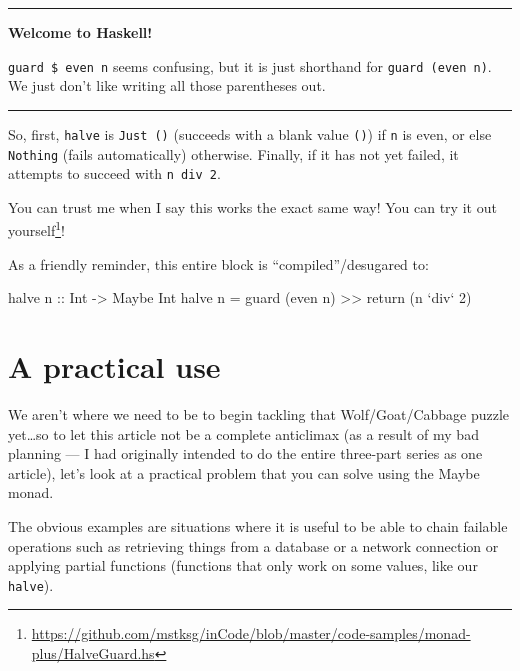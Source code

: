 \documentclass[]{article}
\newenvironment{Shaded}{}{}
\newcommand{\DataTypeTok}[1]{\textcolor[rgb]{0.56,0.13,0.00}{#1}}
\newcommand{\DecValTok}[1]{\textcolor[rgb]{0.25,0.63,0.44}{#1}}
\newcommand{\OtherTok}[1]{\textcolor[rgb]{0.00,0.44,0.13}{#1}}
\newcommand{\FunctionTok}[1]{\textcolor[rgb]{0.02,0.16,0.49}{#1}}
\newcommand{\NormalTok}[1]{#1}
\renewcommand{\href}[2]{#2\footnote{\url{#1}}}
\begin{document}
\begin{center}\rule{0.5\linewidth}{\linethickness}\end{center}

\textbf{Welcome to Haskell!}

\texttt{guard\ \$\ even\ n} seems confusing, but it is just shorthand for
\texttt{guard\ (even\ n)}. We just don't like writing all those parentheses out.

\begin{center}\rule{0.5\linewidth}{\linethickness}\end{center}

So, first, \texttt{halve} is \texttt{Just\ ()} (succeeds with a blank value
\texttt{()}) if \texttt{n} is even, or else \texttt{Nothing} (fails
automatically) otherwise. Finally, if it has not yet failed, it attempts to
succeed with \texttt{n\ \textasciigrave{}div\textasciigrave{}\ 2}.

You can trust me when I say this works the exact same way! You can
\href{https://github.com/mstksg/inCode/blob/master/code-samples/monad-plus/HalveGuard.hs}{try
it out yourself}!

As a friendly reminder, this entire block is ``compiled''/desugared to:

\begin{Shaded}
\begin{Highlighting}[]
\NormalTok{halve}\OtherTok{ n ::} \DataTypeTok{Int} \OtherTok{->} \DataTypeTok{Maybe} \DataTypeTok{Int}
\NormalTok{halve n }\FunctionTok{=}\NormalTok{ guard (even n) }\FunctionTok{>>}\NormalTok{ return (n }\OtherTok{`div`} \DecValTok{2}\NormalTok{)}
\end{Highlighting}
\end{Shaded}

\section{A practical use}\label{a-practical-use}

We aren't where we need to be to begin tackling that Wolf/Goat/Cabbage puzzle
yet\ldots{}so to let this article not be a complete anticlimax (as a result of
my bad planning --- I had originally intended to do the entire three-part series
as one article), let's look at a practical problem that you can solve using the
Maybe monad.

The obvious examples are situations where it is useful to be able to chain
failable operations such as retrieving things from a database or a network
connection or applying partial functions (functions that only work on some
values, like our \texttt{halve}).
\end{document}
